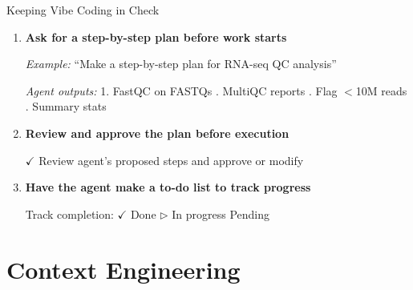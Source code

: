 \documentclass[aspectratio=169]{beamer}
\begin{document}
\begin{frame}{Keeping Vibe Coding in Check}
  \begin{enumerate}
    \item \textbf{Ask for a step-by-step plan before work starts}

    \vspace{0.1cm}
    \small
    \textit{Example:} ``Make a step-by-step plan for RNA-seq QC analysis''

    \vspace{0.1cm}
    \footnotesize
    \textit{Agent outputs:}
    1. FastQC on FASTQs . MultiQC reports . Flag $<$10M reads . Summary stats

    \vspace{0.2cm}

    \item \textbf{Review and approve the plan before execution}

    \vspace{0.1cm}
    \small
    \textcolor{conesaTeal}{$\checkmark$} Review agent's proposed steps and approve or modify

    \vspace{0.2cm}

    \item \textbf{Have the agent make a to-do list to track progress}

    \vspace{0.1cm}
    \small
    Track completion: \textcolor{conesaTeal}{$\checkmark$} Done \;\;
    \textcolor{conesaOrange}{$\triangleright$} In progress \;\;
    Pending
  \end{enumerate}
\end{frame}

\section{Context Engineering}
\end{document}
